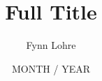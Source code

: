 \documentclass[
    11pt,                                                                                   %
    aspectratio=169,                                                                        %
]{beamer}
\title[Short Title]{Full Title}                                                             %
\author[Fynn Lohre]{Fynn Lohre}                                                             %
\institute[ISS]{Institute of Statistical Statistics \\ (ISS)}                               %
\date[Year]{MONTH / YEAR}                                                                   %
\begin{document}
\begin{frame}
\maketitle                                                                                  %
\end{frame}


\end{document}
